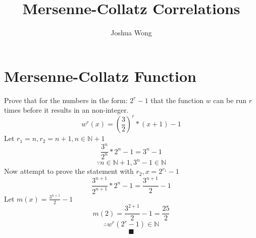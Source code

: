 \documentclass[a4paper,10pt]{article}
\title{Mersenne-Collatz Correlations}
\author{Joshua Wong}
\begin{document}
\maketitle

\begin{abstract}

\end{abstract}

\section{Mersenne-Collatz Function}
Prove that for the numbers in the form: $2^r-1$ that the function $w$ can be run $r$ times before it results in an non-integer.
\[w^{r}(x) = \left(\frac{3}{2}\right)^{r}*(x+1)-1\]
Let $r_1 = n, r_2 = n+1, n \in \mathbb{N}+1$
\[\frac{3^n}{2^n}*2^n-1=3^n-1\]
\[\because n \in \mathbb{N}+1, 3^n-1 \in \mathbb{N}\]
Now attempt to prove the statement with $r_2, x = 2^{r_1}-1$
\[\frac{3^{n+1}}{2^{n+1}}*2^n-1=\frac{3^{n+1}}{2}-1\]
Let $m(x)=\frac{3^{n+1}}{2}-1$
\[m(2)=\frac{3^{2+1}}{2}-1=\frac{25}{2}\]
\[\therefore w^r(2^r-1) \in \mathbb{N}\]
\[\blacksquare\]
\end{document}
